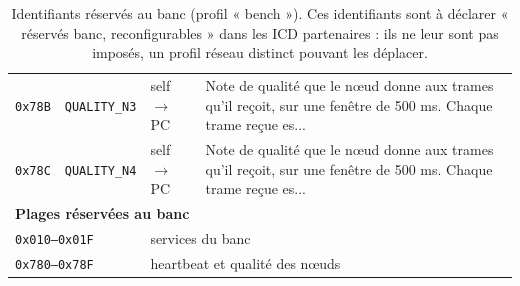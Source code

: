 \begin{table}[H]
\begin{tabular}{llll}
\texttt{0x78B} & \texttt{QUALITY\_N3} & self $\rightarrow$ PC & Note de qualité que le nœud donne aux trames qu'il reçoit, sur une fenêtre de 500 ms. Chaque trame reçue es... \\
\texttt{0x78C} & \texttt{QUALITY\_N4} & self $\rightarrow$ PC & Note de qualité que le nœud donne aux trames qu'il reçoit, sur une fenêtre de 500 ms. Chaque trame reçue es... \\
\midrule
\multicolumn{4}{l}{\textbf{Plages réservées au banc}} \\
\multicolumn{2}{l}{\texttt{0x010--0x01F}} & \multicolumn{2}{l}{services du banc} \\
\multicolumn{2}{l}{\texttt{0x780--0x78F}} & \multicolumn{2}{l}{heartbeat et qualité des nœuds} \\
\bottomrule
\end{tabular}
\caption{Identifiants réservés au banc (profil « bench »). Ces identifiants sont à déclarer « réservés banc, reconfigurables » dans les ICD partenaires : ils ne leur sont pas imposés, un profil réseau distinct pouvant les déplacer.}
\label{tab:icd-reserves}
\end{table}
